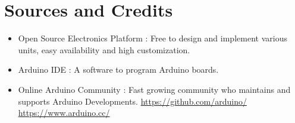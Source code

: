 \chapter*{Sources and Credits}
\begin{fullwidth}
	\begin{itemize}
		\item Open Source Electronics Platform : Free to design and implement various units, easy availability and high customization. 
		
		\item Arduino \ac{IDE} : A software to program Arduino boards.
		
		\item Online Arduino Community : Fast growing community who maintains and supports Arduino Developments.
		\url{https://github.com/arduino/} \hspace{0.5cm} \url{https://www.arduino.cc/}
	\end{itemize}
\end{fullwidth}